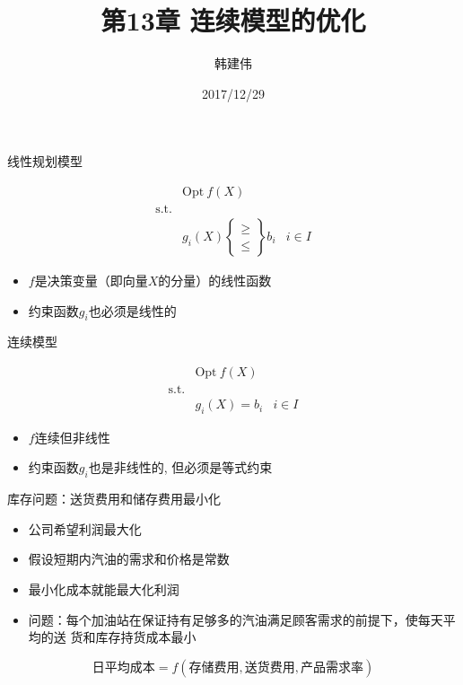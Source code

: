 \documentclass[UTF8]{ctexbeamer}
\title{第13章 连续模型的优化}
\author{韩建伟}
\institute{
  信息学院\\
  \texttt{hanjianwei@zjgsu.edu.cn}
}
\date{2017/12/29}
\begin{document}
\begin{frame}[plain]
  \titlepage{}
\end{frame}

\begin{frame}{线性规划模型}
  \begin{block}{}
    \[ 
    \begin{array}{lcl}
      & \mbox{Opt}\ f(X) & \\
      \mbox{s.t.} & &  \\
      &
      g_i(X) \left\{
        \begin{array}{c}
          \ge\\
          \le
        \end{array}
      \right\} b_i& i \in I
    \end{array}
    \]
  \end{block}

  \begin{itemize}
  \item $f$是决策变量（即向量$X$的分量）的线性函数
  \item 约束函数$g_i$也必须是线性的
  \end{itemize}
  
\end{frame}

\begin{frame}{连续模型}
  \begin{block}{}
    \[ 
    \begin{array}{lcl}
      & \mbox{Opt}\ f(X) & \\
      \mbox{s.t.} & &  \\
      &
      g_i(X) = b_i& i \in I
    \end{array}
    \]
  \end{block}

  \begin{itemize}
  \item $f$连续但非线性
  \item 约束函数$g_i$也是非线性的, 但必须是等式约束
  \end{itemize}
  
\end{frame}

\begin{frame}{库存问题：送货费用和储存费用最小化}

  \begin{itemize}
  \item<1-> 公司希望利润最大化
  \item<2-> 假设短期内汽油的需求和价格是常数
  \item<3-> 最小化成本就能最大化利润
  \item<4-> 问题：每个加油站在保证持有足够多的汽油满足顾客需求的前提下，使每天平均的送
    货和库存持货成本最小 
  \end{itemize}

   {
    \[
      \text{日平均成本} = f(\text{存储费用}, \text{送货费用}, \text{产品需求率})
    \]
  }
  
\end{frame}
\end{document}
